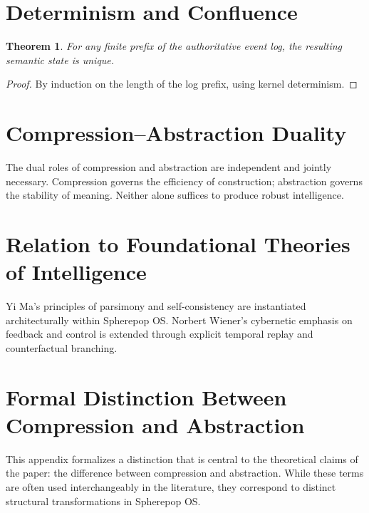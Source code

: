\documentclass[11pt]{article}
\newtheorem{theorem}{Theorem}[section]
\begin{document}

\appendix

\section{Determinism and Confluence}

\begin{theorem}
For any finite prefix of the authoritative event log, the resulting semantic
state is unique.
\end{theorem}

\begin{proof}
By induction on the length of the log prefix, using kernel determinism.
\end{proof}

\section{Compression--Abstraction Duality}

The dual roles of compression and abstraction are independent and jointly
necessary. Compression governs the efficiency of construction; abstraction
governs the stability of meaning. Neither alone suffices to produce robust
intelligence.

\section{Relation to Foundational Theories of Intelligence}

Yi Ma’s principles of parsimony and self-consistency are instantiated
architecturally within Spherepop OS. Norbert Wiener’s cybernetic emphasis
on feedback and control is extended through explicit temporal replay and
counterfactual branching.



\section{Formal Distinction Between Compression and Abstraction}

This appendix formalizes a distinction that is central to the theoretical
claims of the paper: the difference between compression and abstraction.
While these terms are often used interchangeably in the literature, they
correspond to distinct structural transformations in Spherepop OS.
\end{document}
